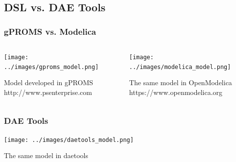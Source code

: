 \documentclass{beamer}
\begin{document}
\subsection{DSL vs. DAE Tools}
\begin{frame}
\frametitle{gPROMS vs. Modelica}
\begin{columns}[b]
  \begin{column}{0.5\paperwidth}
    \begin{center}
      \texttt{[image: ../images/gproms\_model.png]}
    \end{center}
    \begin{center}
      {\small Model developed in gPROMS\\
	      http://www.psenterprise.com}
    \end{center}
  \end{column}
  \begin{column}{0.5\paperwidth}
    \begin{center}
      \texttt{[image: ../images/modelica\_model.png]}
    \end{center}
    \begin{center}
      {\small The same model in OpenModelica\\
	      https://www.openmodelica.org}
    \end{center}
  \end{column}
\end{columns}
\end{frame}

\begin{frame}
\frametitle{DAE Tools}
  \begin{center}
    \texttt{[image: ../images/daetools\_model.png]}
  \end{center}
  \begin{center}
    {\small The same model in daetools}
  \end{center}
\end{frame}
\end{document}
